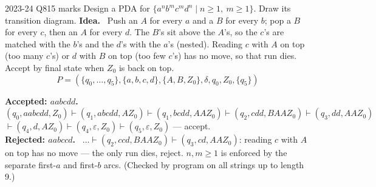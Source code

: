 \documentclass[10.5pt,a4paper]{article}
\newcommand{\ansh}[1]{\textbf{\color{exborder}#1}\ }
\newcommand{\eps}{\varepsilon}
\begin{document}
\begin{examq}{2023-24 Q8}{15 marks}
Design a PDA for $\{a^nb^mc^md^n\mid n\ge1,\ m\ge1\}$. Draw its transition diagram.
\tcblower
\ansh{Idea.} Push an $A$ for every $a$ and a $B$ for every $b$; pop a $B$ for every $c$, then an $A$ for every $d$. The $B$'s sit above the
$A$'s, so the $c$'s are matched with the $b$'s and the $d$'s with the $a$'s (nested). Reading $c$ with $A$ on top (too many $c$'s) or $d$ with
$B$ on top (too few $c$'s) has no move, so that run dies. Accept by final state when $Z_0$ is back on top.
\[P=(\{q_0,\dots,q_5\},\{a,b,c,d\},\{A,B,Z_0\},\delta,q_0,Z_0,\{q_5\})\]
\begin{center}
\end{center}
\ansh{Accepted: $aabcdd$.} $(q_0,aabcdd,Z_0)\vdash(q_1,abcdd,AZ_0)\vdash(q_1,bcdd,AAZ_0)\vdash(q_2,cdd,BAAZ_0)\vdash(q_3,dd,AAZ_0)$
$\vdash(q_4,d,AZ_0)\vdash(q_4,\eps,Z_0)\vdash(q_5,\eps,Z_0)$ --- accept.\\
\ansh{Rejected: $aabccd$.} $\dots\vdash(q_2,ccd,BAAZ_0)\vdash(q_3,cd,AAZ_0)$: reading $c$ with $A$ on top has no move --- the only run dies, reject.
$n,m\ge1$ is enforced by the separate first-$a$ and first-$b$ arcs. (Checked by program on all strings up to length 9.)
\end{examq}
\end{document}
